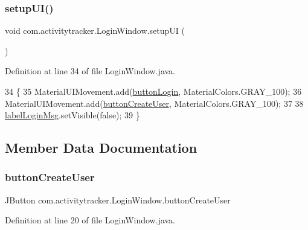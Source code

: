 \subsubsection{\texorpdfstring{setup\+U\+I()}{setupUI()}}
{\footnotesize\ttfamily void com.\+activitytracker.\+Login\+Window.\+setup\+UI (\begin{DoxyParamCaption}{ }\end{DoxyParamCaption})\hspace{0.3cm}{\ttfamily [private]}}



Definition at line 34 of file Login\+Window.\+java.


\begin{DoxyCode}
34                            \{
35         MaterialUIMovement.add(\mbox{\hyperlink{classcom_1_1activitytracker_1_1_login_window_ac77d9f8f3a6c697a9847ecd130ac2ef6}{buttonLogin}}, MaterialColors.GRAY\_100);
36         MaterialUIMovement.add(\mbox{\hyperlink{classcom_1_1activitytracker_1_1_login_window_a1ff77d6846d01d4a8540371ede091371}{buttonCreateUser}}, MaterialColors.GRAY\_100);
37 
38         \mbox{\hyperlink{classcom_1_1activitytracker_1_1_login_window_a567ae49b39c07840b39eec92fdf92c22}{labelLoginMsg}}.setVisible(\textcolor{keyword}{false});
39     \}
\end{DoxyCode}


\subsection{Member Data Documentation}
\mbox{\label{classcom_1_1activitytracker_1_1_login_window_a1ff77d6846d01d4a8540371ede091371}} 
\subsubsection{\texorpdfstring{button\+Create\+User}{buttonCreateUser}}
{\footnotesize\ttfamily J\+Button com.\+activitytracker.\+Login\+Window.\+button\+Create\+User\hspace{0.3cm}{\ttfamily [private]}}



Definition at line 20 of file Login\+Window.\+java.

